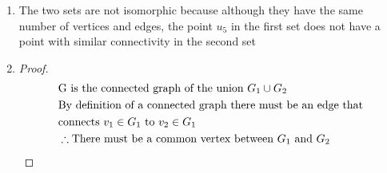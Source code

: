 \documentclass[11pt]{article}
\begin{document}
\begin{enumerate}
    \item The two sets are not isomorphic because although they have the same
    number of vertices and edges, the point $u_5$ in the first set does not have
    a point with similar connectivity in the second set
    \item \begin{proof}
        \begin{align*}
            & \text{G is the connected graph of the union } G_1 \cup G_2 \\
            & \text{By definition of a connected graph there must be an edge that} \\
            & \text{connects $v_1 \in G_1$ to $v_2 \in G_1$} \\
            & \therefore \text{There must be a common vertex between $G_1$ and $G_2$} \qedhere
        \end{align*}
    \end{proof}
\end{enumerate}
\end{document}
